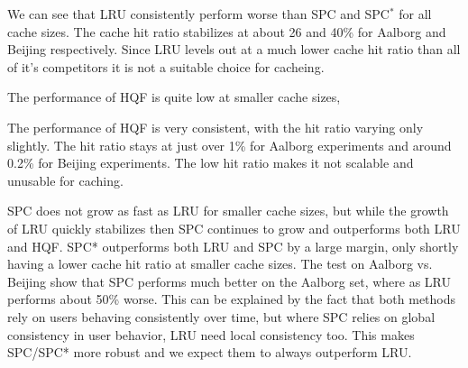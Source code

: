 {\color{red}
We can see that LRU consistently perform worse than SPC and SPC$^*$ for all cache sizes. The cache hit ratio stabilizes at about 26 and 40\% for Aalborg and Beijing respectively. Since LRU levels out at a much lower cache hit ratio than all of it's competitors it is not a suitable choice for \spath cacheing.


The performance of HQF is quite low at smaller cache sizes, 

The performance of HQF is very consistent, with the hit ratio varying only slightly. The hit ratio stays at just over 1\% for Aalborg experiments and around 0.2\% for Beijing experiments. The low hit ratio makes it not scalable and unusable for \spath caching.
}

SPC does not grow as fast as LRU for smaller cache sizes, but while the growth of LRU quickly stabilizes then SPC continues to grow and outperforms both LRU and HQF.
SPC* outperforms both LRU and SPC by a large margin, only shortly having a lower cache hit ratio at smaller cache sizes. The test on Aalborg vs. Beijing  show that SPC performs much better on the Aalborg set, where as LRU performs about 50\% worse. This can be explained by the fact that both methods rely on users behaving consistently over time, but where SPC relies on global consistency in user behavior, LRU need local consistency too. This makes SPC/SPC* more robust and we expect them to always outperform LRU.



